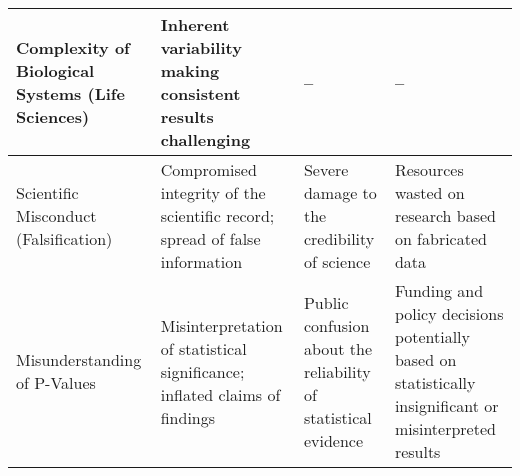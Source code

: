 \documentclass{article}
\begin{document}
\begin{table}[ht]
\begin{tabularx}{\textwidth}{|X|X|X|X|}
        \hline
        Complexity of Biological Systems (Life Sciences) & Inherent variability making consistent results challenging                      & --                                                                  & --                                                                                                      \\
        \hline
        Scientific Misconduct (Falsification)            & Compromised integrity of the scientific record; spread of false information     & Severe damage to the credibility of science                         & Resources wasted on research based on fabricated data                                                   \\
        \hline
        Misunderstanding of P-Values                     & Misinterpretation of statistical significance; inflated claims of findings      & Public confusion about the reliability of statistical evidence      & Funding and policy decisions potentially based on statistically insignificant or misinterpreted results \\
        \hline
    \end{tabularx}
\end{table}





\end{document}
